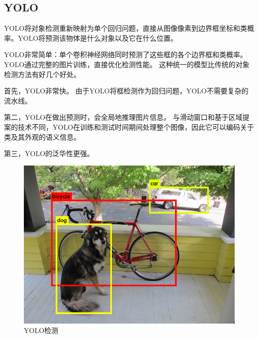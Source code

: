 \subsection{YOLO\cite{yolo}}{
YOLO将对象检测重新映射为单个回归问题，直接从图像像素到边界框坐标和类概率。YOLO将预测该物体是什么对象以及它在什么位置。

YOLO非常简单：单个卷积神经网络同时预测了这些框的各个边界框和类概率。YOLO通过完整的图片训练，直接优化检测性能。 这种统一的模型比传统的对象检测方法有好几个好处。

首先，YOLO非常快。 由于YOLO将框检测作为回归问题，YOLO不需要复杂的流水线。

第二，YOLO在做出预测时，会全局地推理图片信息。 与滑动窗口和基于区域提案的技术不同，YOLO在训练和测试时间期间处理整个图像，因此它可以编码关于类及其外观的语义信息。

第三，YOLO的泛华性更强。
\begin{figure}[htbp]
\centering
\includegraphics[width=5in]{images/YOLO.png}
\caption{YOLO检测}
\label{YOLO}
\end{figure}
}

